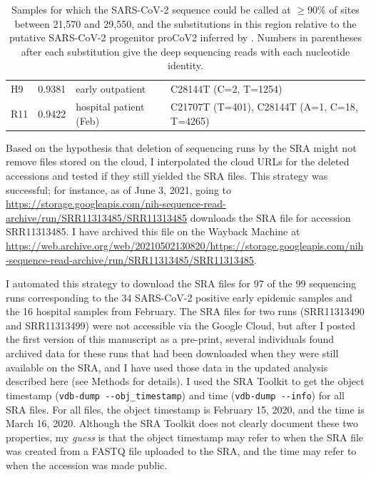 \documentclass[9pt,twocolumn,twoside]{gsajnl_modified}
\begin{document}
\begin{table}[b!]
{\begin{tabular}{lrll}
H9 &                               0.9381 &        early outpatient &                                                     C28144T (C=2, T=1254)  \\
R11 &                               0.9422 &  hospital patient (Feb) &                               C21707T (T=401), C28144T (A=1, C=18, T=4265)  \\
\bottomrule
\end{tabular}
}
\caption{Samples for which the SARS-CoV-2 sequence could be called at $\ge$90\% of sites between 21,570 and 29,550, and the substitutions in this region relative to the putative SARS-CoV-2 progenitor proCoV2 inferred by \citet{kumar2021evolutionary}.
Numbers in parentheses after each substitution give the deep sequencing reads with each nucleotide identity.
\label{tab:mutations}
}
\end{table}

Based on the hypothesis that deletion of sequencing runs by the SRA might not remove files stored on the cloud, I interpolated the cloud URLs for the deleted accessions and tested if they still yielded the SRA files.
This strategy was successful; for instance, as of June 3, 2021, going to \url{https://storage.googleapis.com/nih-sequence-read-archive/run/SRR11313485/SRR11313485} downloads the SRA file for accession SRR11313485.
I have archived this file on the Wayback Machine at \url{https://web.archive.org/web/20210502130820/https://storage.googleapis.com/nih-sequence-read-archive/run/SRR11313485/SRR11313485}.

I automated this strategy to download the SRA files for 97 of the 99 sequencing runs corresponding to the 34 SARS-CoV-2 positive early epidemic samples and the 16 hospital samples from February.
The SRA files for two runs (SRR11313490 and SRR11313499) were not accessible via the Google Cloud, but after I posted the first version of this manuscript as a pre-print, several individuals found archived data for these runs that had been downloaded when they were still available on the SRA, and I have used those data in the updated analysis described here (see Methods for details).
I used the SRA Toolkit to get the object timestamp (\texttt{vdb-dump -{}-obj\_timestamp}) and time (\texttt{vdb-dump -{}-info}) for all SRA files.
For all files, the object timestamp is February 15, 2020, and the time is March 16, 2020.
Although the SRA Toolkit does not clearly document these two properties, my \emph{guess} is that the object timestamp may refer to when the SRA file was created from a FASTQ file uploaded to the SRA, and the time may refer to when the accession was made public.
\end{document}
